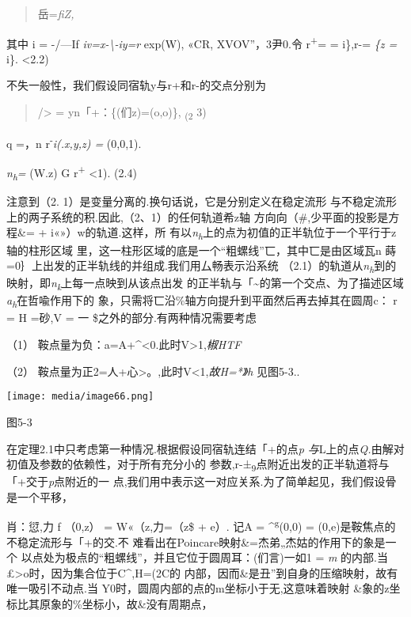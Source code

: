\documentclass{article}
\begin{document}
\begin{quote}
岳=\emph{fiZ,}
\end{quote}

其中 i = -/---If \emph{iv=x-\textbackslash{}-iy=r} exp(W), «CR,
XVOV''，3尹0.令 r\textsuperscript{+}= = i\},r-= \emph{\{z =} i\}.
\textless{}2.2)

不失一般性，我们假设同宿轨y与r+和r-的交点分别为

\begin{quote}
/\textgreater{} = yn「+：\{(们z)=(o,o)\}, \textsubscript{(2} 3)
\end{quote}

q =，n r\textsuperscript{-}\emph{i(.x,y,z) =} (0,0,1).

\emph{n\textsubscript{h}=} (W.z) G r\textsuperscript{+} \textless{}1).
(2.4)

注意到（2. 1）是变量分离的.换句话说，它是分别定义在稳定流形
与不稳定流形上的两子系统的积.因此,（2、1）的任何轨道希z轴
方向向（\#,少平面的投影是方程\&= + i«»）w的轨道.这样，所
有以\emph{n\textsubscript{h}}上的点为初值的正半轨位于一个平行于z轴的柱形区域
里，这一柱形区域的底是一个``粗螺线''匸，其中匸是由区域瓦n
蒔=0｝上出发的正半轨线的并组成.我们用厶畅表示沿系统
（2.1）的轨道从\emph{n\textsubscript{h}}到的映射，即\emph{n\textsubscript{k}}上每一点映到从该点出发
的正半轨与「\textasciitilde{}的第一个交点、为了描述区域\emph{a\textsubscript{h}}在哲喩作用下的
象，只需将匸沿\%轴方向提升到平面然后再去掉其在圆周c： r = H =砂,V = 一
\$之外的部分.有两种情况需要考虑

（1） 鞍点量为负：a=A+\^{}\textless{}0.此时V\textgreater{}1,\emph{椒HTF}

（2）
鞍点量为正2=人+心\textgreater{}。,此时V\textless{}1,\emph{故H=*》h}
见图5-3..

\texttt{[image: media/image66.png]}

图5-3

在定理2.1中只考虑第一种情况.根据假设同宿轨连结「+的点\emph{p
与}L上的点\emph{Q.}由解对初值及参数的依赖性，对于所有充分小的
参数,r-±\textsubscript{9}点附近出发的正半轨道将与「+交于\emph{p}点附近的一
点,我们用中表示这一对应关系.为了简单起见，我们假设骨 是一个平移，

肖：愆,力 f （0,z） = W«（z,力=（z\$ + e）. 记A =
\^{}\textsuperscript{g}(0,0) = (0,e)是鞍焦点的不稳定流形与「+的交.不
难看出在Poincare映射\&=杰弟„杰姑的作用下的象是一个
以点处为极点的``粗螺线''，并且它位于圆周耳：\textbar{}(们言)一如1 =
\emph{m} 的内部.当£\textgreater{}o时，因为集合位于C\^{},H=(2C的
内部，因而\&是丑''到自身的压缩映射，故有唯一吸引不动点.当
Y0时，圆周内部的点的m坐标小于无,这意味着映射
\&象的z坐标比其原象的\%坐标小，故\&没有周期点，
\end{document}
